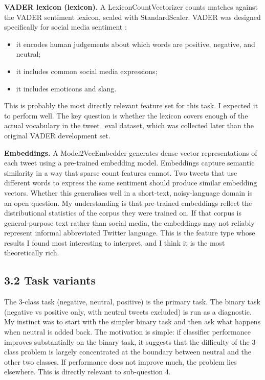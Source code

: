 \documentclass[12pt]{article}
\begin{document}
\textbf{VADER lexicon (lexicon).} A LexiconCountVectorizer counts matches against the VADER sentiment lexicon, scaled with StandardScaler. VADER was designed specifically for social media sentiment \citep{hutto2014vader}:
\begin{itemize}
  \item it encodes human judgements about which words are positive, negative, and neutral;
  \item it includes common social media expressions;
  \item it includes emoticons and slang.
\end{itemize} This is probably the most directly relevant feature set for this task. I expected it to perform well. The key question is whether the lexicon covers enough of the actual vocabulary in the tweet\_eval dataset, which was collected later than the original VADER development set.

\textbf{Embeddings.} A Model2VecEmbedder generates dense vector representations of each tweet using a pre-trained embedding model. Embeddings capture semantic similarity in a way that sparse count features cannot. Two tweets that use different words to express the same sentiment should produce similar embedding vectors. Whether this generalises well in a short-text, noisy-language domain is an open question. My understanding is that pre-trained embeddings reflect the distributional statistics of the corpus they were trained on. If that corpus is general-purpose text rather than social media, the embeddings may not reliably represent informal abbreviated Twitter language. This is the feature type whose results I found most interesting to interpret, and I think it is the most theoretically rich.

\subsection*{3.2 Task variants}

The 3-class task (negative, neutral, positive) is the primary task. The binary task (negative vs positive only, with neutral tweets excluded) is run as a diagnostic. My instinct was to start with the simpler binary task and then ask what happens when neutral is added back. The motivation is simple: if classifier performance improves substantially on the binary task, it suggests that the difficulty of the 3-class problem is largely concentrated at the boundary between neutral and the other two classes. If performance does not improve much, the problem lies elsewhere. This is directly relevant to sub-question 4.
\end{document}
